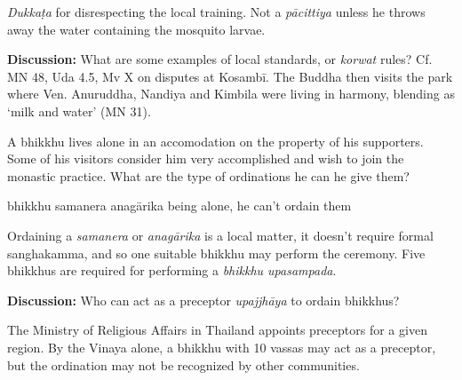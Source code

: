 \begin{exam}{\autoExamName}
\begin{problem}
\begin{solution}
  \emph{Dukkaṭa} for disrespecting the local training. Not a \emph{pācittiya}
  unless he throws away the water containing the mosquito larvae.
\end{solution}

\end{problem}

\bigskip

\textbf{Discussion:} What are some examples of local standards, or \emph{korwat}
rules? Cf. MN 48, Uda 4.5, Mv X on disputes at Kosambī. The Buddha then visits
the park where Ven. Anuruddha, Nandiya and Kimbila were living in harmony,
blending as `milk and water' (MN 31).

\problemDivide

\begin{problem}

  A bhikkhu lives alone in an accomodation on the property of his supporters. Some of
  his visitors consider him very accomplished and wish to join the monastic practice.
  What are the type of ordinations he can he give them?

  \bigskip

  \begin{manswers}{4}
    \bChoices
     bhikkhu\eAns
     samanera\eAns
     anagārika\eAns
     being alone, he can't ordain them\eAns
    \eChoices
  \end{manswers}

\begin{solution}
  Ordaining a \emph{samanera} or \emph{anagārika} is a local matter,
  it doesn't require formal sanghakamma, and so one suitable bhikkhu may perform the ceremony.
  Five bhikkhus are required for performing a \emph{bhikkhu upasampada}.
\end{solution}

\bigskip

\textbf{Discussion:} Who can act as a preceptor \emph{upajjhāya} to ordain bhikkhus?

\begin{solution}
  The Ministry of Religious Affairs in Thailand appoints preceptors for a given region.
  By the Vinaya alone, a bhikkhu with 10 vassas may act as a preceptor, but the
  ordination may not be recognized by other communities.
\end{solution}

\end{problem}

\end{exam}

